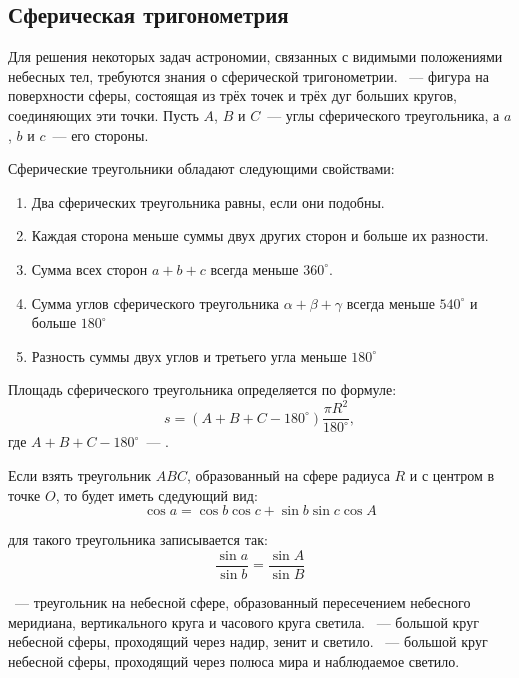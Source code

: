 \subsection{Сферическая тригонометрия}
Для решения некоторых задач астрономии, связанных с видимыми положениями небесных тел, требуются знания о сферической тригонометрии. ~--- фигура на поверхности сферы, состоящая из трёх точек и трёх дуг больших кругов, соединяющих эти точки. Пусть $A$, $B$ и $C$~--- углы сферического треугольника, а $a$, $b$ и $c$~--- его стороны.

Сферические треугольники обладают следующими свойствами:
\begin{enumerate}
\item Два сферических треугольника равны, если они подобны.
\item Каждая сторона меньше суммы двух других сторон и больше их разности.
\item Сумма всех сторон $a+b+c$ всегда меньше $360^{\circ}$.
\item Сумма углов сферического треугольника $\alpha +\beta +\gamma$ всегда меньше $540^{\circ}$  и больше $180^{\circ}$
\item Разность суммы двух углов и третьего угла меньше $180^{\circ}$
\end{enumerate}

Площадь сферического треугольника определяется по формуле:
\begin{equation}
s=(A+B+C-180^{\circ})\frac{\pi R^2}{180^{\circ}},
\end{equation}
где $A+B+C-180^{\circ}$~--- .

Если взять треугольник $ABC$, образованный на сфере радиуса $R$ и с центром в точке $O$, то  будет иметь сдедующий вид:
\begin{equation}
\cos a=\cos b\cos c+\sin b\sin c\cos A
\end{equation}

 для такого треугольника записывается так:
\begin{equation}
\frac{\sin a}{\sin b}=\frac{\sin A}{\sin B}
\end{equation}

~--- треугольник на небесной  сфере, образованный пересечением небесного меридиана, вертикального круга и часового круга светила. ~--- большой круг небесной сферы, проходящий через надир, зенит и светило. ~--- большой круг небесной сферы, проходящий через полюса мира и наблюдаемое светило.

